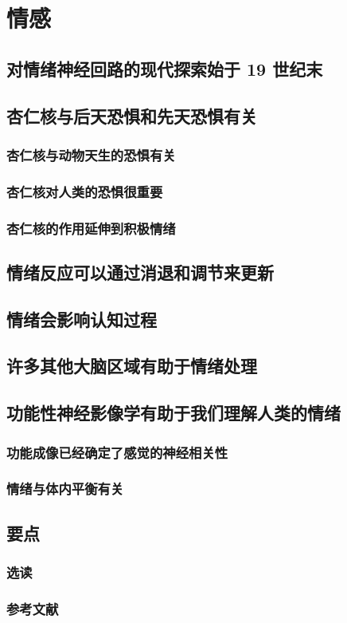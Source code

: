 \chapter{情感}

\section{对情绪神经回路的现代探索始于 19 世纪末}

\section{杏仁核与后天恐惧和先天恐惧有关}
\subsection{杏仁核与动物天生的恐惧有关}
\subsection{杏仁核对人类的恐惧很重要}
\subsection{杏仁核的作用延伸到积极情绪}

\section{情绪反应可以通过消退和调节来更新}

\section{情绪会影响认知过程}

\section{许多其他大脑区域有助于情绪处理}

\section{功能性神经影像学有助于我们理解人类的情绪}
\subsection{功能成像已经确定了感觉的神经相关性}
\subsection{情绪与体内平衡有关}

\section{要点}
\subsection{选读}
\subsection{参考文献}